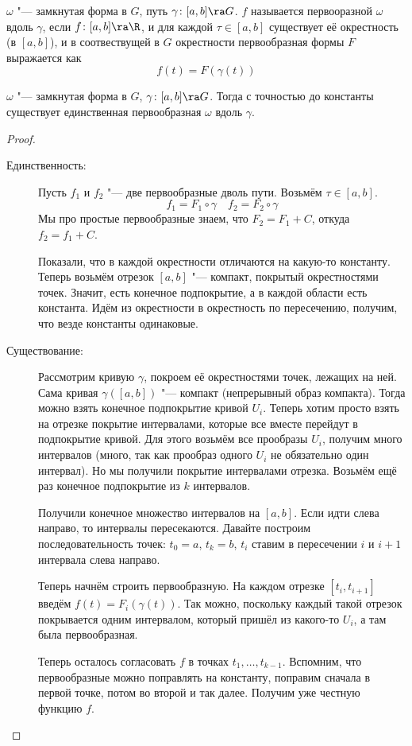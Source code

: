 \begin{Def}
	$\omega$ "--- замкнутая форма в $G$, путь $\gamma\colon [a,b] \ra G$.
	$f$ называется первооразной $\omega$ вдоль $\gamma$, если $f\colon [a, b] \ra \R$,
	и для каждой $\tau \in [a, b]$ существует её окрестность (в $[a,b]$), и в соотвествущей в $G$ окрестности первообразная формы $F$ выражается как
	\[ f(t) = F(\gamma(t)) \]
\end{Def}

\begin{theorem}
	$\omega$ "--- замкнутая форма в $G$, $\gamma\colon [a, b] \ra G$.
	Тогда с точностью до константы существует единственная первообразная $\omega$ вдоль $\gamma$.
\end{theorem}
\begin{proof}\begin{description}
\item[Единственность:]
	Пусть $f_1$ и $f_2$ "--- две первообразные дволь пути.
	Возьмём $\tau \in [a,b]$.
	\[ f_1 = F_1 \circ \gamma \quad f_2 = F_2 \circ \gamma \]
	Мы про простые первообразные знаем, что $F_2 = F_1 + C$, откуда $f_2 = f_1 + C$.

	Показали, что в каждой окрестности отличаются на какую-то константу.
	Теперь возьмём отрезок $[a, b]$ "--- компакт, покрытый окрестностями точек.
	Значит, есть конечное подпокрытие, а в каждой области есть константа.
	Идём из окрестности в окрестность по пересечению, получим, что везде константы одинаковые.

\item[Существование:]
	Рассмотрим кривую $\gamma$, покроем её окрестностями точек, лежащих на ней.
	Сама кривая $\gamma([a, b])$ "--- компакт (непрерывный образ компакта).
	Тогда можно взять конечное подпокрытие кривой $U_i$.
	Теперь хотим просто взять на отрезке покрытие интервалами, которые все вместе перейдут в подпокрытие кривой.
	Для этого возьмём все прообразы $U_i$, получим много интервалов (много, так как прообраз одного $U_i$ не обязательно один интервал).
	Но мы получили покрытие интервалами отрезка.
	Возьмём ещё раз конечное подпокрытие из $k$ интервалов.

	Получили конечное множество интервалов на $[a,b]$.
	Если идти слева направо, то интервалы пересекаются.
	Давайте построим последовательность точек: $t_0 = a$, $t_k = b$, $t_i$ ставим в пересечении $i$ и $i+1$ интервала слева направо.

	Теперь начнём строить первообразную.
	На каждом отрезке $[t_i,t_{i+1}]$ введём $f(t) = F_i(\gamma(t))$.
	Так можно, поскольку каждый такой отрезок покрывается одним интервалом, который пришёл из какого-то $U_i$, а там была первообразная.

	Теперь осталось согласовать $f$ в точках $t_1,\dots,t_{k-1}$.
	Вспомним, что первообразные можно поправлять на константу, поправим сначала в первой точке, потом во второй и так далее.
	Получим уже честную функцию $f$.
\end{description}\end{proof}

